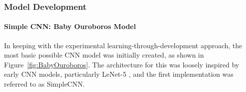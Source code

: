     
    
            \subsubsection{Model Development}
            
            \paragraph{Simple CNN: Baby Ouroboros Model}
    
                In keeping with the experimental learning-through-development approach, the most basic possible CNN model was initially created, as shown in Figure~\ref{fig:BabyOuroboros}. The architecture for this was loosely inspired by early CNN models, particularly LeNet-5 \cite{726791}, and the first implementation was referred to as SimpleCNN.
    
